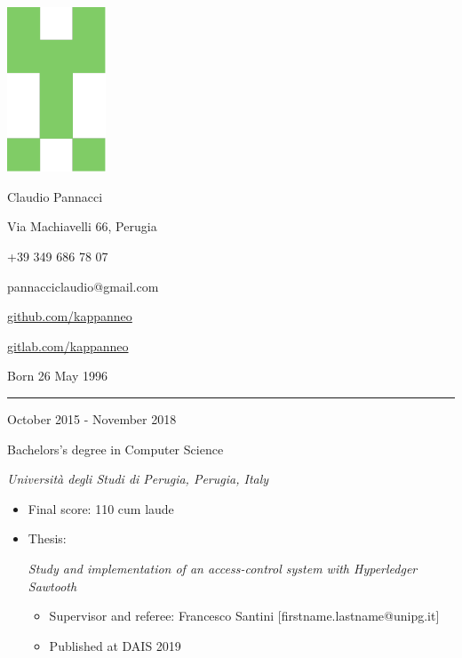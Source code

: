\documentclass[a4paper,10pt]{article}
\newlength{\cvcolumngapwidth}
\newlength{\cvleftcolumnwidth}
\newlength{\cvrightcolumnwidth}
\newcommand{\cvnamestyle}[1]{{\Large\cvnamefont\textcolor{cvnamecolor}{#1}}}
\newcommand{\cvsectionstyle}[1]{{\normalsize\cvsectionfont\textcolor{cvsectioncolor}{#1}}}
\newcommand{\cvtitlestyle}[1]{{\large\cvtitlefont\textcolor{cvtitlecolor}{#1}}}
\newcommand{\cvdurationstyle}[1]{{\small\cvdurationfont\textcolor{cvdurationcolor}{#1}}}
\newlength{\cvafteritemskipamount}
\newlength{\cvaftersectionskipamount}
\newlength{\cvafternameskipamount}
\newlength{\cvafterpersonalinfolineskipamount}
\newlength{\cvaftertitleskipamount}
\newlength{\cvparskip}
\newcommand{\cvpersonalinfo}[2]{
    \begin{minipage}[t]{\cvleftcolumnwidth}
        \vspace{0mm} %
        \raggedleft #1
    \end{minipage}%
    \hspace{\cvcolumngapwidth}%
    \begin{minipage}[t]{\cvrightcolumnwidth}
        \vspace{0mm} %
        #2
    \end{minipage}

    \vspace{\cvafteritemskipamount}
}
\newcommand{\cvname}[1]{
    \cvnamestyle{#1}

    \vspace{\cvafternameskipamount}
}
\newcommand{\cvpersonalinfolinewithicon}[3]{
    \raisebox{.5\fontcharht\font`E-.5\height}{\texttt{[image: \#2]}}
    #3

    \vspace{\cvafterpersonalinfolineskipamount}
}
\newcommand{\cvsection}[1]{
    \begin{minipage}[t]{\cvleftcolumnwidth}
        \raggedleft\cvsectionstyle{#1}
    \end{minipage}%
    \hspace{\cvcolumngapwidth}%
    \begin{minipage}[t]{\cvrightcolumnwidth}
        \textcolor{cvrulecolor}{\rule{\cvrightcolumnwidth}{0.3mm}}
    \end{minipage}

    \vspace{\cvaftersectionskipamount}
}
\newcommand{\cvitem}[2]{
    \begin{minipage}[t]{\cvleftcolumnwidth}
        \raggedleft #1
    \end{minipage}%
    \hspace{\cvcolumngapwidth}%
    \begin{minipage}[t]{\cvrightcolumnwidth}
        \setlength{\parskip}{\cvparskip} #2
    \end{minipage}

    \vspace{\cvafteritemskipamount}
}
\newcommand{\cvtitle}[1]{
    \cvtitlestyle{#1}

    \vspace{\cvaftertitleskipamount}
    \vspace{-\cvparskip}
}
\begin{document}

\cvpersonalinfo{
    \includegraphics[height=49mm]{kappanneo.pdf}
}{
    \cvname{Claudio Pannacci}

    \cvpersonalinfolinewithicon{height=4mm}{072-location.pdf}{
        Via Machiavelli 66, Perugia
    }

    \cvpersonalinfolinewithicon{height=4mm}{067-phone.pdf}{
        +39 349 686 78 07
    }

    \cvpersonalinfolinewithicon{height=4mm}{070-envelop.pdf}{
        pannacciclaudio@gmail.com
    }

    \cvpersonalinfolinewithicon{height=4mm}{github.pdf}{
        \href{https://github.com/kappanneo}{github.com/kappanneo}
    }

    \cvpersonalinfolinewithicon{height=4mm}{gitlab.pdf}{
         \href{https://gitlab.com/kappanneo}{gitlab.com/kappanneo}
    }

    Born 26 May 1996
}



\cvsection{EDUCATION}


\cvitem{
    \cvdurationstyle{October 2015 - November 2018}
}{
    \cvtitle{Bachelors's degree in Computer Science}

    \textit{Università degli Studi di Perugia, Perugia, Italy}

    \begin{itemize}[leftmargin=*]
        \item Final score:
        110 cum laude

        \item Thesis:
        
        \textit{Study and implementation of an access-control system with Hyperledger Sawtooth}
        
    \begin{itemize}[leftmargin=*]
        \item Supervisor and referee:
        Francesco Santini [firstname.lastname@unipg.it]
        
        \item Published at DAIS 2019
    \end{itemize}
    \end{itemize}
}
\end{document}
